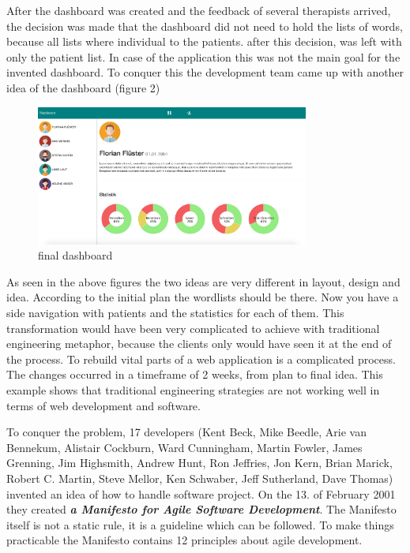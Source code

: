 After the dashboard was created and the feedback of several therapists arrived, the decision was made that the dashboard did not need to hold the lists of words, because all lists where individual to the patients.
after this decision, was left with only the patient list. In case of the application this was not the main goal for the invented dashboard. To conquer this the development team came up with another
idea of the dashboard (figure 2)

\begin{figure}[h!]
  \centering
  \includegraphics[width=0.8\textwidth]{images/sidenav.png}
  \caption{final dashboard}
\end{figure}

\newpage

As seen in the above figures the two ideas are very different in layout, design and idea. According to the initial plan the wordlists should be there.
Now you have a side navigation with patients and the statistics for each of them. This transformation would have been very
complicated to achieve with traditional engineering metaphor, because the clients only would have seen it at the end of the process. To rebuild vital
parts of a web application is a complicated process. The changes occurred in a timeframe of 2 weeks, from plan to final idea.
This example shows that traditional engineering strategies are not working well in terms of web development and software.

To conquer the problem, 17 developers (Kent Beck, Mike Beedle, Arie van Bennekum, Alistair Cockburn, Ward Cunningham, Martin Fowler, James Grenning,
Jim Highsmith, Andrew Hunt, Ron Jeffries, Jon Kern, Brian Marick, Robert C. Martin, Steve Mellor, Ken Schwaber, Jeff Sutherland, Dave Thomas)
invented an idea of how to handle software project. On the 13. of February 2001 they created \textbf{\textit{a Manifesto for Agile Software Development}}.
The Manifesto itself is not a static rule, it is a guideline which can be followed. To make things practicable the Manifesto contains 12 principles about
agile development.

